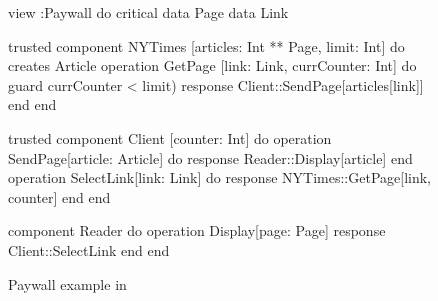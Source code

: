 \begin{figure}[ht]
\centering
  \begin{slang}
view :Paywall do
  critical data Page
  data Link
  
  trusted component NYTimes [articles: Int ** Page, limit: Int] do
    creates Article
    operation GetPage [link: Link, currCounter: Int] do
      guard    { currCounter < limit) }
      response { Client::SendPage[articles[link]] }
    end
  end

  trusted component Client [counter: Int] do
    operation SendPage[article: Article] do 
      response { Reader::Display[article] }
    end
    operation SelectLink[link: Link] do
      response { NYTimes::GetPage[link, counter] }
    end
  end

  component Reader do
    operation Display[page: Page]
    response { Client::SelectLink }
  end
end
  \end{slang}

\caption{Paywall example in \sLang}
\label{fig-paywall-slang}
\end{figure}
